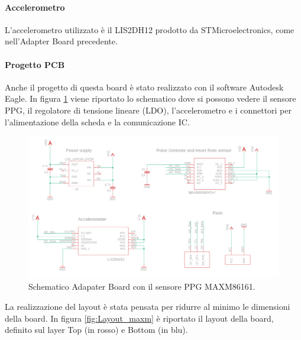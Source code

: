 \paragraph{Accelerometro} L'accelerometro utilizzato è il LIS2DH12 prodotto da STMicroelectronics, come nell'Adapter Board precedente.
\pagebreak

\paragraph{Progetto PCB} Anche il progetto di questa board è stato realizzato con il software Autodesk Eagle. In figura \ref{fig:schematic_max} viene riportato lo schematico dove si possono vedere il sensore PPG, il regolatore di tensione lineare (LDO), l'accelerometro e i connettori per l'alimentazione della scheda e la comunicazione IC.
\begin{figure}[b]
	\centering
	\includegraphics[width=0.8\linewidth]{ImageFiles/Hardware/schematic_max}
	\caption{Schematico Adapater Board con il sensore PPG MAXM86161.}
	\label{fig:schematic_max}
\end{figure}
La realizzazione del layout è stata pensata per ridurre al minimo le dimensioni della board. In figura \ref{fig:Layout_maxm} è riportato il layout della board, definito sul layer Top (in rosso) e Bottom (in blu).
